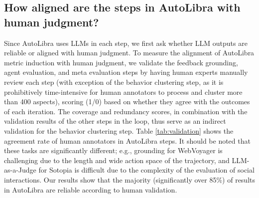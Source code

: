 \subsection{How aligned are the steps in AutoLibra with human judgment?}
Since AutoLibra uses LLMs in each step, we first ask whether LLM outputs are reliable
or aligned with human judgment. To measure the alignment of AutoLibra metric
induction with human judgment, we validate the feedback grounding, agent
evaluation, and meta evaluation steps by having human experts manually review each
step (with exception of the behavior clustering step, as it is prohibitively time-intensive
for human annotators to process and cluster more than 400 aspects), scoring (1/0)
based on whether they agree with the outcomes of each iteration. The coverage
and redundancy scores, in combination with the validation results of the other steps
in the loop, thus serve as an indirect validation for the behavior clustering
step. Table \ref{tab:validation} shows the agreement rate of human annotators in
AutoLibra steps. It should be noted that these tasks are significantly different;
e.g., grounding for WebVoyager \citep{he2024webvoyager} is challenging due to
the length and wide action space of the trajectory, and LLM-as-a-Judge for Sotopia
\citep{zhousotopia} is difficult due to the complexity of the evaluation of
social interactions. Our results show that the majority (significantly over 85\%)
of results in AutoLibra are reliable according to human validation.



